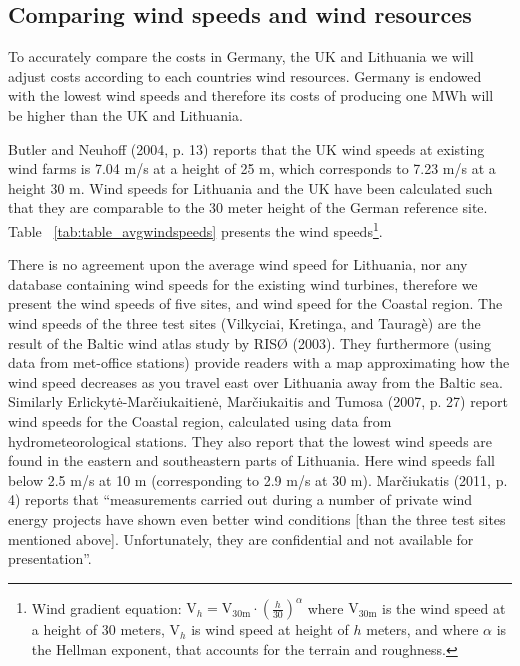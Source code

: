 \documentclass[a4paper, 12pt]{article}
\begin{document}
\subsection{Comparing wind speeds and wind resources}
To accurately compare the costs in Germany, the UK and Lithuania we will adjust costs according to each countries wind resources. Germany is endowed with the lowest wind speeds and therefore its costs of producing one MWh will be higher than the UK and Lithuania. 

Butler and Neuhoff (2004, p. 13) reports that the UK wind speeds at existing wind farms is 7.04 m/s at a height of 25 m, which corresponds to 7.23 m/s at a height 30 m. Wind speeds for Lithuania and the UK have been calculated such that they are comparable to the 30 meter height of the German reference site. Table ~\ref{tab:table_avgwindspeeds} presents the wind speeds\footnote{Wind gradient equation: $\text{V}_h = \text{V}_\text{30m} \cdot \left(\frac{h}{30}\right)^\alpha$ where $\text{V}_\text{30m}$ is the wind speed at a height of 30 meters, $\text{V}_h$ is wind speed at height of $h$ meters, and where  $\alpha$ is the Hellman exponent, that accounts for the terrain and roughness.}.

There is no agreement upon the average wind speed for Lithuania, nor any database containing wind speeds for the existing wind turbines, therefore we present the wind speeds of five sites, and wind speed for the Coastal region. The wind speeds of the three test sites (Vilkyciai, Kretinga, and Tauragè) are the result of the Baltic wind atlas study by RISØ (2003). They furthermore (using data from met-office stations) provide readers with a map approximating how the wind speed decreases as you travel east over Lithuania away from the Baltic sea. Similarly Erlickytė-Marčiukaitienė, Marčiukaitis and Tumosa (2007, p. 27) report wind speeds for the Coastal region, calculated using data from hydrometeorological stations. They also report that the lowest wind speeds are found in the eastern and southeastern parts of Lithuania. Here wind speeds fall below 2.5 m/s at 10 m (corresponding to 2.9 m/s at 30 m). Marčiukatis (2011, p. 4) reports that ``measurements carried out during a number of private wind energy projects have shown even better wind conditions [than the three test sites mentioned above]. Unfortunately, they are confidential and not available for presentation''.
\end{document}
